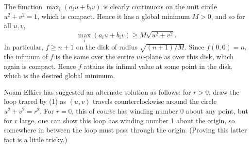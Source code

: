 \documentclass[amssymb,twocolumn,pra,10pt,aps]{revtex4-1}
\begin{document}
\begin{itemize}
The function $\max_{i} (a_{i}u + b_{i}v)$ is clearly
continuous on the unit circle $u^{2} + v^{2} = 1$, which is compact.
Hence it has a global minimum $M > 0$, and so for all $u,v$,
\[
\max_{i} (a_{i} u + b_{i} v) \geq M \sqrt{u^{2} + v^{2}}.
\]
In particular, $f \geq n+1$ on the disk of radius $\sqrt{(n+1)/M}$.
Since $f(0,0) = n$, the infimum of $f$ is the same over the entire
$uv$-plane as over this disk, which again is compact.
Hence $f$ attains its infimal value at some point in the disk,
which is the desired global minimum.

Noam Elkies has suggested an alternate solution as follows: for $r >
0$, draw the loop traced by (1) as $(u,v)$ travels
counterclockwise around the circle $u^2 + v^2 = r^2$. For $r=0$, this
of course has winding number 0 about any point, but for $r$ large, one
can show this loop has winding number 1 about the origin, so somewhere in
between the loop must pass through the origin. (Proving this latter
fact is a little tricky.)

\end{itemize}
\end{document}
